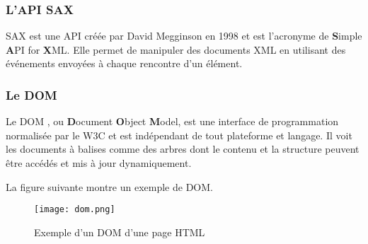 \subsubsection{L'API SAX}

SAX \cite{sax_website, sax_oracle} est une API créée par David Megginson en 1998 et est l'acronyme de \textbf{S}imple \textbf{A}PI for \textbf{X}ML. Elle permet de manipuler des documents XML en utilisant des événements envoyées à chaque rencontre d'un élément.


\subsubsection{Le DOM}

Le DOM \cite{dom_w3c}, ou \textbf{D}ocument \textbf{O}bject \textbf{M}odel, est une interface de programmation normalisée par le W3C et est indépendant de tout plateforme et langage. Il voit les documents à balises comme des arbres dont le contenu et la structure peuvent être accédés et mis à jour dynamiquement.

\par
La figure suivante montre un exemple de DOM.

\begin{figure}[!h]
\centering
\texttt{[image: dom.png]}\\[1cm]
\caption{Exemple d'un DOM d'une page HTML}
\end{figure}


%
